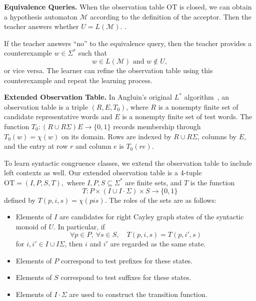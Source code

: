 \documentclass{ieice-tecrep}
\providecommand{\tightlist}{}
\begin{document}
\textbf{Equivalence Queries.} When the observation table \(\mathrm{OT}\) is closed, we can obtain a hypothesis
automaton \(\mathcal{M}\) according to the definition of the acceptor.
Then the teacher answers whether \(U = L(\mathcal{M})\).
.

If the teacher answers ``no'' to the equivalence query, then the teacher provides a counterexample \(w \in \Sigma^*\) such that
\[
w \in L(\mathcal{M}) \text{ and } w \notin U,
\]
or vice versa. The learner can refine the observation table using this counterexample and repeat the learning process.

\textbf{Extended Observation Table.} In Angluin's original \(L^*\) algorithm~\cite{angluin87}, an
observation table is a triple \((R,E,T_0)\), where \(R\) is a
nonempty finite set of candidate representative words and \(E\) is a
nonempty finite set of test words. The function
\(T_0:(R\cup R\Sigma)E\to\{0,1\}\) records membership through
\(T_0(w)=\chi(w)\) on its domain.
Rows are indexed by \(R\cup R\Sigma\), columns by \(E\), and
the entry at row \(r\) and column \(e\) is \(T_0(re)\).

To learn syntactic congruence classes, we extend the observation table
to include left contexts as well. Our extended observation table
is a 4-tuple
\(
\mathrm{OT} = (I,P,S,T),
\)
where  \(I,P,S \subseteq \Sigma^*\) are finite sets, and \(T\) is the function
\[
T : P\times( I \cup I \cdot \Sigma) \times S \to \{0,1\}
\]
defined by \(T(p,i,s)=\chi(pis)\). The roles of the sets are as follows:

\begin{itemize}
\tightlist
\item
  Elements of \(I\) are candidates for right Cayley graph states of the syntactic monoid of \(U\).
  In particular, if
  \[
  \forall p\in P,\ \forall s\in S,\quad
  T(p,i,s) = T(p,i',s)
  \]
  for \(i,i'\in I\cup I\Sigma\),
  then \(i\) and \(i'\) are regarded as the same state.
\item
  Elements of \(P\) correspond to test prefixes for these states.
\item
  Elements of \(S\) correspond to test suffixes for these states.
\item
  Elements of \(I \cdot \Sigma\) are used to construct the transition
  function.
\end{itemize}
\end{document}
